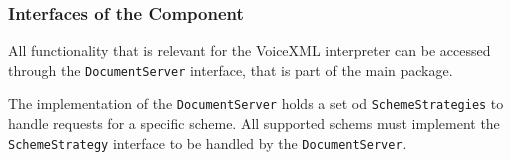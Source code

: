 \documentclass[11pt,a4paper]{article}
\begin{document}
\begin{center}
\end{center}

\subsubsection{Interfaces of the Component}

All functionality that is relevant for the VoiceXML interpreter can be accessed
through the \texttt{DocumentServer} interface, that is part of the main package.

The implementation of the \texttt{Document\-Server} holds a set od
\texttt{Scheme\-Strategies} to handle requests for a specific scheme.
All supported schems must implement the \texttt{Scheme\-Strategy} interface to be
handled by the \texttt{Docu\-ment\-Server}.
\end{document}
